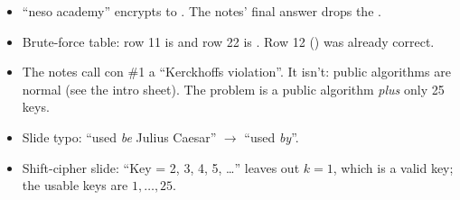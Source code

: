 \begin{fixbox}
\begin{itemize}
  \item ``neso academy'' encrypts to . The notes' final answer  drops the .
  \item Brute-force table: row 11 is  and row 22 is . Row 12 () was already correct.
  \item The notes call con \#1 a ``Kerckhoffs violation''. It isn't: public algorithms are normal (see the intro sheet). The problem is a public algorithm \emph{plus} only 25 keys.
  \item Slide typo: ``used \emph{be} Julius Caesar'' $\to$ ``used \emph{by}''.
  \item Shift-cipher slide: ``Key = 2, 3, 4, 5, \dots'' leaves out $k = 1$, which is a valid key; the usable keys are $1, \dots, 25$.
\end{itemize}
\end{fixbox}
